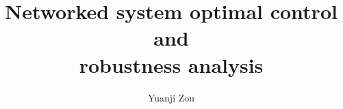 

\phd %

%
\title{\bf Networked system optimal control and \\ robustness analysis}
\author{Yuanji Zou}


\abstract{}

\copyrightpage       %

\acknowledgements{}
\dedication{}


\beforepreface

\figurespage
\tablespage

\afterpreface
